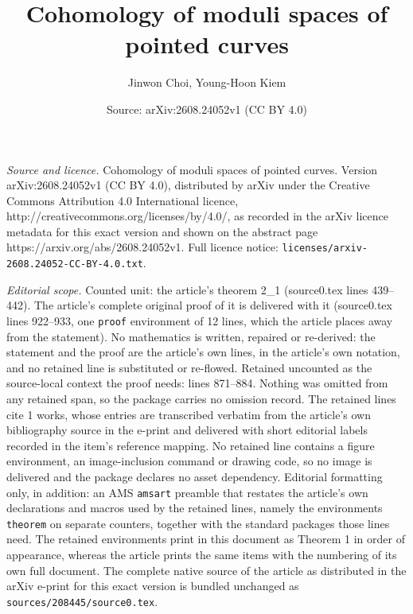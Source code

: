 \documentclass[10pt,a4paper]{amsart}
\title{Cohomology of moduli spaces of pointed curves}
\author{Jinwon Choi, Young-Hoon Kiem}
\date{Source: arXiv:2608.24052v1 (CC BY 4.0)}
\begin{document}
\maketitle

\noindent\emph{Source and licence.} Cohomology of moduli spaces of pointed curves. Version arXiv:2608.24052v1 (CC BY 4.0), distributed by arXiv under the Creative Commons Attribution 4.0 International licence, http://creativecommons.org/licenses/by/4.0/, as recorded in the arXiv licence metadata for this exact version and shown on the abstract page https://arxiv.org/abs/2608.24052v1. Full licence notice: \texttt{licenses/arxiv-2608.24052-CC-BY-4.0.txt}.\par\smallskip

\noindent\textit{Editorial scope.} Counted unit: the article's theorem 2\_1 (source0.tex lines 439--442). The article's complete original proof of it is delivered with it (source0.tex lines 922--933, one \texttt{proof} environment of 12 lines, which the article places away from the statement). No mathematics is written, repaired or re-derived: the statement and the proof are the article's own lines, in the article's own notation, and no retained line is substituted or re-flowed.  Retained uncounted as the source-local context the proof needs: lines 871--884.  Nothing was omitted from any retained span, so the package carries no omission record.  The retained lines cite 1 works, whose entries are transcribed verbatim from the article's own bibliography source in the e-print and delivered with short editorial labels recorded in the item's reference mapping.  No retained line contains a figure environment, an image-inclusion command or drawing code, so no image is delivered and the package declares no asset dependency.  Editorial formatting only, in addition: an AMS \texttt{amsart} preamble that restates the article's own declarations and macros used by the retained lines, namely the environments \texttt{theorem} on separate counters, together with the standard packages those lines need.  The retained environments print in this document as Theorem 1 in order of appearance, whereas the article prints the same items with the numbering of its own full document.  The complete native source of the article as distributed in the arXiv e-print for this exact version is bundled unchanged as \texttt{sources/208445/source0.tex}.
\end{document}
